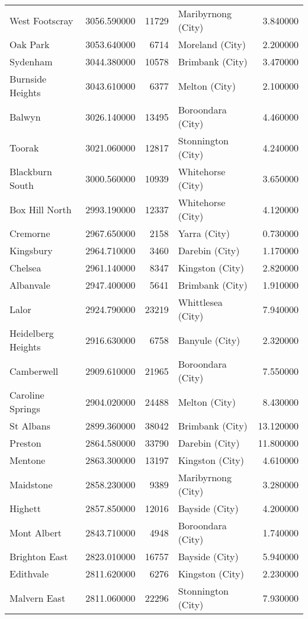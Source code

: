 \begin{table}
\begin{tabular}{lrrlr}
West Footscray & 3056.590000 & 11729 & Maribyrnong (City) & 3.840000 \\
Oak Park & 3053.640000 & 6714 & Moreland (City) & 2.200000 \\
Sydenham & 3044.380000 & 10578 & Brimbank (City) & 3.470000 \\
Burnside Heights & 3043.610000 & 6377 & Melton (City) & 2.100000 \\
Balwyn & 3026.140000 & 13495 & Boroondara (City) & 4.460000 \\
Toorak & 3021.060000 & 12817 & Stonnington (City) & 4.240000 \\
Blackburn South & 3000.560000 & 10939 & Whitehorse (City) & 3.650000 \\
Box Hill North & 2993.190000 & 12337 & Whitehorse (City) & 4.120000 \\
Cremorne & 2967.650000 & 2158 & Yarra (City) & 0.730000 \\
Kingsbury & 2964.710000 & 3460 & Darebin (City) & 1.170000 \\
Chelsea & 2961.140000 & 8347 & Kingston (City) & 2.820000 \\
Albanvale & 2947.400000 & 5641 & Brimbank (City) & 1.910000 \\
Lalor & 2924.790000 & 23219 & Whittlesea (City) & 7.940000 \\
Heidelberg Heights & 2916.630000 & 6758 & Banyule (City) & 2.320000 \\
Camberwell & 2909.610000 & 21965 & Boroondara (City) & 7.550000 \\
Caroline Springs & 2904.020000 & 24488 & Melton (City) & 8.430000 \\
St Albans & 2899.360000 & 38042 & Brimbank (City) & 13.120000 \\
Preston & 2864.580000 & 33790 & Darebin (City) & 11.800000 \\
Mentone & 2863.300000 & 13197 & Kingston (City) & 4.610000 \\
Maidstone & 2858.230000 & 9389 & Maribyrnong (City) & 3.280000 \\
Highett & 2857.850000 & 12016 & Bayside (City) & 4.200000 \\
Mont Albert & 2843.710000 & 4948 & Boroondara (City) & 1.740000 \\
Brighton East & 2823.010000 & 16757 & Bayside (City) & 5.940000 \\
Edithvale & 2811.620000 & 6276 & Kingston (City) & 2.230000 \\
Malvern East & 2811.060000 & 22296 & Stonnington (City) & 7.930000 \\

\end{tabular}
\end{table}
